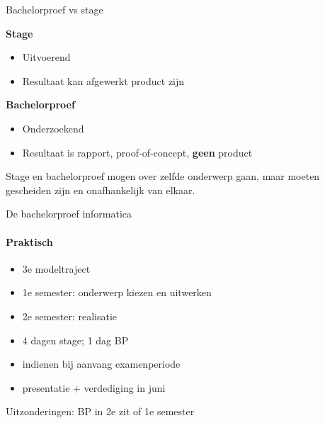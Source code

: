 \documentclass[usenames,dvipsnames]{beamer}
\begin{document}
\begin{frame}{Bachelorproef vs stage}

  \begin{multicols}{2}
    \textbf{Stage}
    
    \begin{itemize}
      \item Uitvoerend
      \item Resultaat kan afgewerkt product zijn
    \end{itemize}
    
    \columnbreak
    
    \textbf{Bachelorproef}
    
    \begin{itemize}
      \item Onderzoekend
      \item Resultaat is rapport, proof-of-concept, \textbf{geen} product
    \end{itemize}
  \end{multicols}

Stage en bachelorproef mogen over zelfde onderwerp gaan, maar moeten gescheiden zijn en onafhankelijk van elkaar.

\end{frame}

\begin{frame}{De bachelorproef informatica}
  \framesubtitle{Praktisch}
  
  \begin{itemize}
    \item 3e modeltraject
    \item 1e semester: onderwerp kiezen en uitwerken
    \item 2e semester: realisatie
    \item 4 dagen stage; 1 dag BP
    \item indienen bij aanvang examenperiode
    \item presentatie + verdediging in juni
  \end{itemize}

Uitzonderingen: BP in 2e zit of 1e semester
\end{frame}
\end{document}
